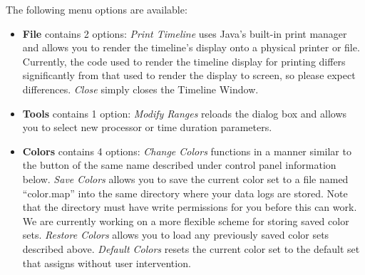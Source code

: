 \documentclass[10pt]{article}
\begin{document}



The following menu options are available:

\begin{itemize}
\item {\bf File} contains 2 options: {\it Print Timeline} uses Java's
built-in print manager and allows you to render the timeline's display
onto a physical printer or file. Currently, the code used to render
the timeline display for printing differs significantly from that used
to render the display to screen, so please expect differences. 
{\it Close} simply closes the Timeline Window.
\item {\bf Tools} contains 1 option: {\it Modify Ranges} reloads the 
dialog box and allows you to select new processor or time duration
parameters.
\item {\bf Colors} contains 4 options: {\it Change Colors} functions in
a manner similar to the button of the same name described under control 
panel information below. {\it Save Colors} allows you to save the current
color set to a file named ``color.map'' into the same directory where your
data logs are stored. Note that the directory must have write permissions
for you before this can work. We are currently working on a more flexible
scheme for storing saved color sets. {\it Restore Colors} allows you to
load any previously saved color sets described above. {\it Default Colors}
resets the current color set to the default set that \projections{} assigns
without user intervention.
\end{itemize}
\end{document}
